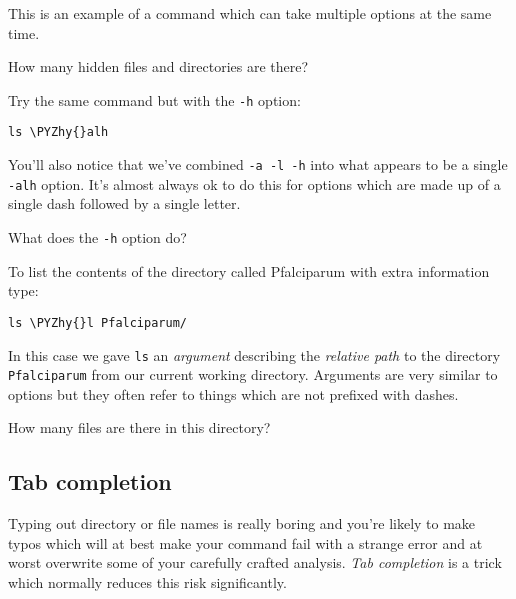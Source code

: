 \documentclass[11pt]{article}
\makeatletter
\def\PYZhy{\char`\-}
\newcommand{\boxspacing}{\kern\kvtcb@left@rule\kern\kvtcb@boxsep}
\newcommand{\prompt}[4]{
        {\ttfamily\llap{{\color{blue}\LARGE\faKeyboardO\hspace{3pt}#4}}\vspace{-\baselineskip}}
    }
\makeatother
\begin{document}
    This is an example of a command which can take multiple options at the
same time.

How many hidden files and directories are there?

    Try the same command but with the \texttt{-h} option:

    \begin{tcolorbox}[breakable, size=fbox, boxrule=1pt, pad at break*=1mm,colback=cellbackground, colframe=cellborder]
\prompt{In}{incolor}{ }{\boxspacing}
\begin{Verbatim}[commandchars=\\\{\}]
ls \PYZhy{}alh
\end{Verbatim}
\end{tcolorbox}

    You'll also notice that we've combined \texttt{-a\ -l\ -h} into what
appears to be a single \texttt{-alh} option. It's almost always ok to do
this for options which are made up of a single dash followed by a single
letter.

What does the \texttt{-h} option do?

    To list the contents of the directory called Pfalciparum with extra
information type:

    \begin{tcolorbox}[breakable, size=fbox, boxrule=1pt, pad at break*=1mm,colback=cellbackground, colframe=cellborder]
\prompt{In}{incolor}{ }{\boxspacing}
\begin{Verbatim}[commandchars=\\\{\}]
ls \PYZhy{}l Pfalciparum/
\end{Verbatim}
\end{tcolorbox}

    In this case we gave \texttt{ls} an \textit{argument} describing the
\textit{relative path} to the directory \texttt{Pfalciparum} from our
current working directory. Arguments are very similar to options but
they often refer to things which are not prefixed with dashes.

How many files are there in this directory?

    \hypertarget{tab-completion}{%
\subsection{Tab completion}\label{tab-completion}}

Typing out directory or file names is really boring and you're likely to
make typos which will at best make your command fail with a strange
error and at worst overwrite some of your carefully crafted analysis.
\textit{Tab completion} is a trick which normally reduces this risk
significantly.
\end{document}
